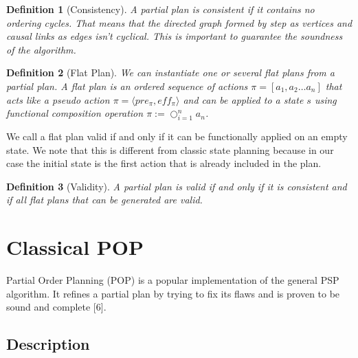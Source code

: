 \documentclass[]{article}
\newtheorem{definition}{Definition}
\begin{document}
\begin{definition}[Consistency]

A partial plan is consistent if it contains no ordering cycles. That
means that the directed graph formed by step as vertices and causal
links as edges isn't cyclical. This is important to guarantee the
soundness of the algorithm.

\end{definition}

\begin{definition}[Flat Plan]

We can instantiate one or several flat plans from a partial plan. A flat
plan is an ordered sequence of actions \(\pi = [ a_1, a_2 \ldots a_n]\)
that acts like a pseudo action
\(\pi = \langle pre_\pi, eff_\pi \rangle\) and can be applied to a state
\(s\) using functional composition operation
\(\pi := \bigcirc_{i=1}^n a_n\).

\end{definition}

We call a flat plan valid if and only if it can be functionally applied
on an empty state. We note that this is different from classic state
planning because in our case the initial state is the first action that
is already included in the plan.

\begin{definition}[Validity]

A partial plan is valid if and only if it is consistent and if all flat
plans that can be generated are valid.

\end{definition}

\section{Classical POP}\label{classical-pop}

Partial Order Planning (POP) is a popular implementation of the general
PSP algorithm. It refines a partial plan by trying to fix its flaws and
is proven to be sound and complete {[}6{]}.

\subsection{Description}\label{description}
\end{document}
